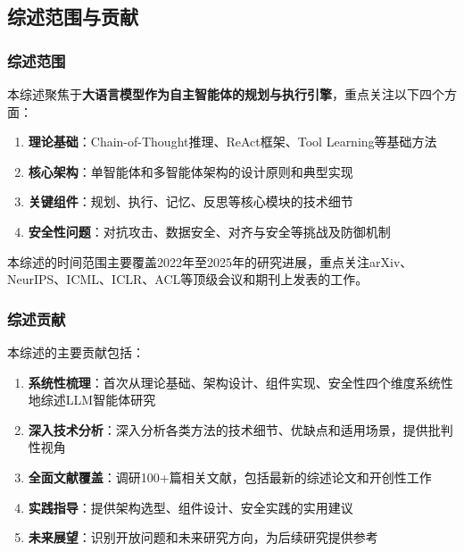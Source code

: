 \subsection{综述范围与贡献}

\subsubsection{综述范围}

本综述聚焦于\textbf{大语言模型作为自主智能体的规划与执行引擎}，重点关注以下四个方面：

\begin{enumerate}[leftmargin=2em]
    \item \textbf{理论基础}：Chain-of-Thought推理、ReAct框架、Tool Learning等基础方法
    \item \textbf{核心架构}：单智能体和多智能体架构的设计原则和典型实现
    \item \textbf{关键组件}：规划、执行、记忆、反思等核心模块的技术细节
    \item \textbf{安全性问题}：对抗攻击、数据安全、对齐与安全等挑战及防御机制
\end{enumerate}

本综述的时间范围主要覆盖2022年至2025年的研究进展，重点关注arXiv、NeurIPS、ICML、ICLR、ACL等顶级会议和期刊上发表的工作。

\subsubsection{综述贡献}

本综述的主要贡献包括：

\begin{enumerate}[leftmargin=2em]
    \item \textbf{系统性梳理}：首次从理论基础、架构设计、组件实现、安全性四个维度系统性地综述LLM智能体研究
    
    \item \textbf{深入技术分析}：深入分析各类方法的技术细节、优缺点和适用场景，提供批判性视角
    
    \item \textbf{全面文献覆盖}：调研100+篇相关文献，包括最新的综述论文和开创性工作
    
    \item \textbf{实践指导}：提供架构选型、组件设计、安全实践的实用建议
    
    \item \textbf{未来展望}：识别开放问题和未来研究方向，为后续研究提供参考
\end{enumerate}

